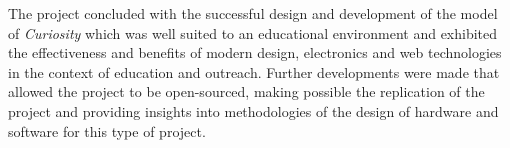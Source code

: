   The project concluded with the successful design and development of the model of \textit{Curiosity} which was well suited to an educational environment and exhibited the effectiveness and benefits of modern design, electronics and web technologies in the context of education and outreach. Further developments were made that allowed the project to be open-sourced, making possible the replication of the project and providing insights into methodologies of the design of hardware and software for this type of project.